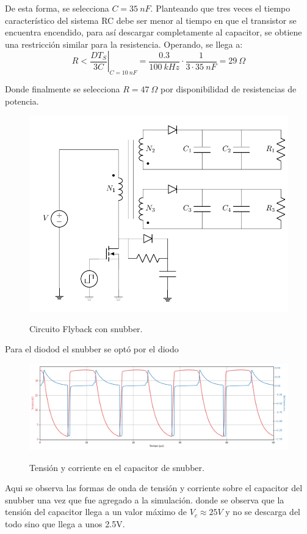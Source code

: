 De esta forma, se selecciona $C = 35 \ nF$. Planteando que tres veces el tiempo característico del sistema RC debe ser menor al tiempo en que el transistor se encuentra encendido, para así descargar completamente al capacitor, se obtiene una restricción similar para la resistencia. Operando, se llega a:
\begin{equation}
	R < \left. \frac{DT_S}{3C} \right|_{C = 10 \ nF} = \frac{0.3}{100 \ kHz} \cdot \frac{1}{3 \cdot 35 \ nF} = 29 \ \Omega
\end{equation}

Donde finalmente se selecciona $R = 47 \ \Omega$ por disponibilidad de resistencias de potencia.

\begin{figure}[H]
	\centering
	\includegraphics[width=0.4\linewidth, page = 1]{ImagenesParteII/FlybackSnubber.pdf}
	\label{fig:fly_snubber}
	\caption{Circuito Flyback con snubber.}
\end{figure}
Para el diodod el snubber se optó por el diodo 
\begin{figure}[H]
	\centering
	\includegraphics[width=0.9\linewidth]{ImagenesParteII/Cap_snub.png}
	\label{fig:tensionesvarias}
	\caption{Tensión y corriente en el capacitor de snubber.}
\end{figure}
Aqui se observa las formas de onda de tensión y corriente sobre el capacitor del snubber una vez que fue agregado a la simulación. donde se observa que la tensión del capacitor llega a un valor máximo de $V_c \approx 25V$ y no se descarga del todo sino que llega a unos 2.5V.
